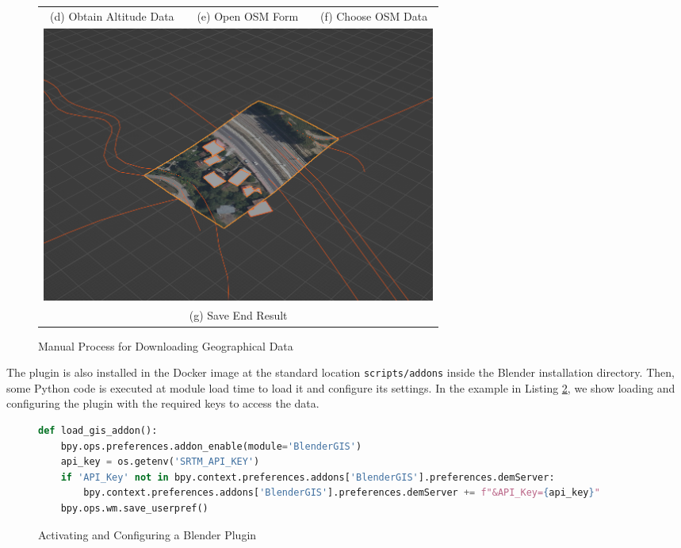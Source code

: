 \begin{figure}[H]
\begin{tabular}{ccc}
  (d) Obtain Altitude Data &   
  (e) Open OSM Form &          
  (f) Choose OSM Data \\
  \multicolumn{3}{c}{ \includegraphics[width=130mm]{src/img/manual-download/7-end-result.png} }  \\ 
  \multicolumn{3}{c}{ (g) Save End Result }
 
\end{tabular}
\caption{Manual Process for Downloading Geographical Data}
\label{fig:manual-download-geo}
\end{figure}


The plugin is also installed in the Docker image at the standard location \texttt{scripts/addons} inside the Blender installation directory. Then, some Python code is executed at module load time to load it and configure its settings. In the example in Listing \ref{fig:blender-plugin}, we show loading and configuring the plugin with the required keys to access the data.

\begin{figure}[H]
\begin{lstlisting}[language=python]
def load_gis_addon():                                   
    bpy.ops.preferences.addon_enable(module='BlenderGIS')
    api_key = os.getenv('SRTM_API_KEY')
    if 'API_Key' not in bpy.context.preferences.addons['BlenderGIS'].preferences.demServer:
        bpy.context.preferences.addons['BlenderGIS'].preferences.demServer += f"&API_Key={api_key}"
    bpy.ops.wm.save_userpref() 
\end{lstlisting}
\caption{Activating and Configuring a Blender Plugin}
\label{fig:blender-plugin}
\end{figure}

